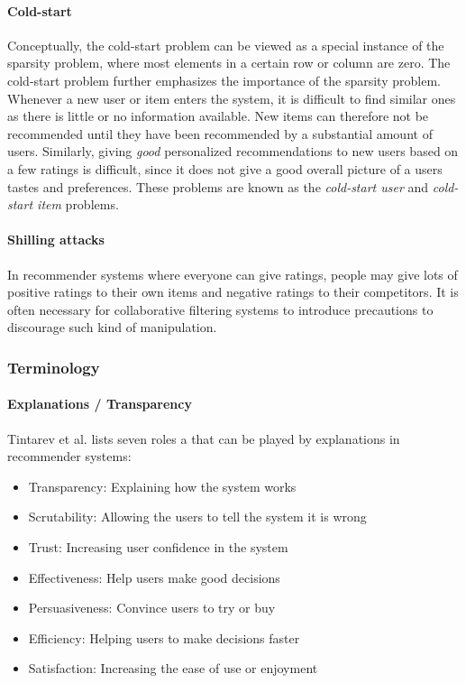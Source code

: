 \paragraph{Cold-start}

Conceptually, the cold-start problem can be viewed as a special instance of the
sparsity problem, where most elements in a certain row or column are zero. The
cold-start problem further emphasizes the importance of the sparsity problem.
Whenever a new user or item enters the system, it is difficult to find similar
ones as there is little or no information available. New items can therefore
not be recommended until they have been recommended by a substantial amount of
users. Similarly, giving \emph{good} personalized recommendations to new users
based on a few ratings is difficult, since it does not give a good overall
picture of a users tastes and preferences. These problems are known as the
\emph{cold-start user} and \emph{cold-start item} problems.

\paragraph{Shilling attacks}

In recommender systems where everyone can give ratings, people may give lots of
positive ratings to their own items and negative ratings to their competitors.
It is often necessary for collaborative filtering systems to introduce
precautions to discourage such kind of manipulation.

\subsubsection{Terminology}


\paragraph{Explanations / Transparency}

Tintarev et al. \cite{Tintarev2007} lists seven roles a that can be played by explanations in recommender systems:

\begin{itemize}
\item Transparency: Explaining how the system works
\item Scrutability: Allowing the users to tell the system it is wrong
\item Trust: Increasing user confidence in the system
\item Effectiveness: Help users make good decisions
\item Persuasiveness: Convince users to try or buy
\item Efficiency: Helping users to make decisions faster
\item Satisfaction: Increasing the ease of use or enjoyment
\end{itemize}

